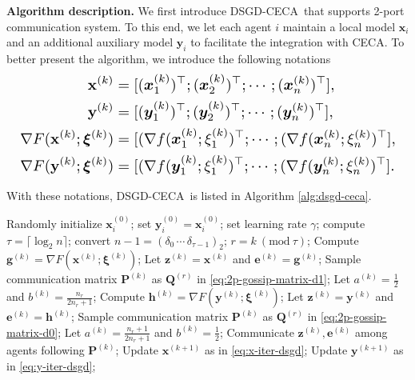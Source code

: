 \documentclass{article}
\newcommand{\ve}{\mathbf{e}}
\newcommand{\vg}{\mathbf{g}}
\newcommand{\vh}{\mathbf{h}}
\newcommand{\vx}{\mathbf{x}}
\newcommand{\bvx}{\boldsymbol{x}}
\newcommand{\vy}{\mathbf{y}}
\newcommand{\bvy}{\boldsymbol{y}}
\newcommand{\vz}{\mathbf{z}}
\newcommand{\vxi}{\bm{\xi}}
\newcommand{\vP}{\mathbf{P}}
\newcommand{\vQ}{\mathbf{Q}}
\newcommand{\ko}{{(k)}}
\newcommand{\kp}{{(k+1)}}
\newcommand{\ro}{{(r)}}
\newcommand{\Mod}[1]{\ (\mathrm{mod}\ #1)}
\newcommand{\Ours}{DSGD-CECA}
\theoremstyle{plain}
\theoremstyle{definition}
\begin{document}
\textbf{Algorithm description.}
We first introduce \Ours\ that supports 2-port communication system. To this end, we let each agent $i$ maintain a local model $\bvx_i$ and an additional auxiliary model $\bvy_i$ to facilitate the integration with CECA. To better present the algorithm, we introduce the following notations
\begin{equation*}
\resizebox{ \columnwidth}{!} {
$\begin{split}
\vx^\ko&=[(\bvx^\ko_1)^\top;(\bvx^\ko_2)^\top;\cdots;(\bvx^\ko_n)^\top], \\
\vy^\ko&=[(\bvy^\ko_1)^\top;(\bvy^\ko_2)^\top;\cdots;(\bvy^\ko_n)^\top], \\
\nabla F(\vx^\ko; \vxi^\ko)&= [(\nabla f(\bvx^\ko_1;\xi_1^\ko)^\top;\cdots;(\nabla f(\bvx^\ko_n;\xi_n^\ko)^\top],\\
\nabla F(\vy^\ko; \vxi^\ko)&= [(\nabla f(\bvy^\ko_1;\xi_1^\ko)^\top;\cdots;(\nabla f(\bvy^\ko_n;\xi_n^\ko)^\top].
\end{split}$
}
\end{equation*}

With these notations, \Ours\ is listed in Algorithm \ref{alg:dsgd-ceca}. 
\begin{algorithm}[tb]
   \caption{DSGD-CECA}
   \label{alg:dsgd-ceca}
\begin{algorithmic}
    Randomly initialize $\bvx_i^{(0)}$; set $\bvy_i^{(0)}=\bvx_i^{(0)}$; {set learning rate $\gamma$;} compute $\tau=\lceil \log_2n \rceil$; convert $n-1 = (\delta_0\,\cdots\, \delta_{\tau-1} )_2$;
   \STATE $r=k\Mod{\tau}$;
   \STATE Compute $\vg^\ko=\nabla F(\vx^\ko;\vxi^\ko)$;
   \STATE Let $\vz^\ko=\vx^\ko$ and  $\ve^\ko=\vg^\ko$;
   \STATE Sample communication matrix $\vP^\ko$ as $\vQ^\ro$ in \eqref{eq:2p-gossip-matrix-d1};
   \STATE Let $a^\ko=\frac{1}{2}$ and $b^\ko=\frac{n_r}{2n_r+1}$;
   \STATE Compute $\vh^\ko=\nabla F(\vy^\ko;\vxi^\ko)$;
   \STATE Let $\vz^\ko=\vy^\ko$ and $\ve^\ko=\vh^\ko$;
   \STATE Sample communication matrix $\vP^\ko$ as $\vQ^\ro$ in \eqref{eq:2p-gossip-matrix-d0};
   \STATE Let $a^\ko=\frac{n_r+1}{2n_r+1}$ and  $b^\ko=\frac{1}{2}$;
   \ENDIF
   \STATE Communicate $\vz^\ko, \ve^\ko$ among agents following $\vP^\ko$;
   \STATE Update $\vx^\kp$ as in \eqref{eq:x-iter-dsgd}; 
   \STATE 
       Update $\vy^\kp$ as in \eqref{eq:y-iter-dsgd};
   \ENDFOR
\end{algorithmic}
\end{algorithm}
\end{document}
